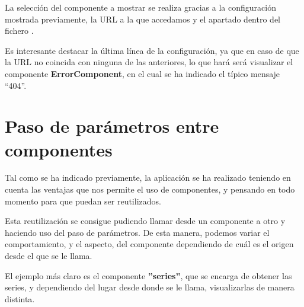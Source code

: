 \documentclass{\ClassPath/viu-tfm-template}
\begin{document}
La selección del componente a mostrar se realiza gracias a la configuración mostrada previamente, la URL a la que accedamos y el apartado  dentro del fichero .

Es interesante destacar la última línea de la configuración, ya que en caso de que la URL no coincida con ninguna de las anteriores, lo que hará será visualizar el componente \textbf{ErrorComponent}, en el cual se ha indicado el típico mensaje “404”.


\section{Paso de parámetros entre componentes}

Tal como se ha indicado previamente, la aplicación se ha realizado teniendo en cuenta las ventajas que nos permite el uso de componentes, y pensando en todo momento para que puedan ser reutilizados.

Esta reutilización se consigue pudiendo llamar desde un componente a otro y haciendo uso del paso de parámetros. De esta manera, podemos variar el comportamiento, y el aspecto, del componente dependiendo de cuál es el origen desde el que se le llama.

El ejemplo más claro es el componente \textbf{”series”}, que se encarga de obtener las series, y dependiendo del lugar desde donde se le llama,  visualizarlas de manera distinta.
\end{document}
